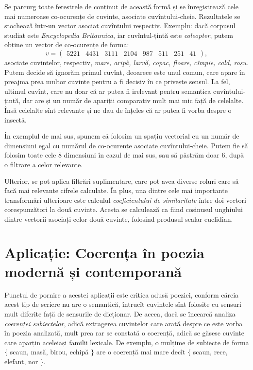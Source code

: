 \documentclass[a4paper]{article}
\begin{document}
Se parcurg toate ferestrele de conținut de această formă și se înregistrează
cele mai numeroase co-ocurențe de cuvinte, asociate cuvîntului-cheie.
Rezultatele se stochează într-un vector asociat cuvîntului respectiv. Exemplu:
dacă corpusul studiat este \emph{Encyclopedia Britannica}, iar cuvîntul-țintă
este \emph{coleopter}, putem obține un vector de co-ocurențe de forma:
\[
  v = \begin{pmatrix}
    5221 & 4431 & 3111 & 2104 & 987 & 511 & 251 & 41
  \end{pmatrix},
\]
asociate cuvintelor, respectiv, \emph{mare, aripă, larvă, copac, floare, %
  cîmpie, cald, roșu}. Putem decide să ignorăm primul cuvînt, deoarece este
unul comun, care apare în preajma prea multor cuvinte pentru a fi decisiv
în ce privește sensul. La fel, ultimul cuvînt, care nu doar că ar putea fi
irelevant pentru semantica cuvîntului-țintă, dar are și un număr de apariții
comparativ mult mai mic față de celelalte. Însă celelalte sînt relevante
și ne dau de înțeles că ar putea fi vorba despre o insectă.

În exemplul de mai sus, spunem că folosim un spațiu vectorial cu un număr de
dimensiuni egal cu numărul de co-ocurențe asociate cuvîntului-cheie. Putem fie
să folosim toate cele 8 dimensiuni în cazul de mai sus, sau să păstrăm doar 6,
după o filtrare a celor relevante.

Ulterior, se pot aplica filtrări suplimentare, care pot avea diverse roluri care
să facă mai relevante cifrele calculate. În plus, una dintre cele mai importante
transformări ulterioare este calculul \emph{coeficientului de similaritate} între
doi vectori corespunzători la două cuvinte. Acesta se calculează ca fiind
cosinusul unghiului dintre vectorii asociați celor două cuvinte, folosind
produsul scalar euclidian.


\section*{Aplicație: Coerența în poezia modernă și contemporană}

Punctul de pornire a acestei aplicații este critica adusă poeziei, conform
căreia acest tip de scriere nu are o semantică, întrucît cuvintele sînt folosite
cu sensuri mult diferite față de sensurile de dicționar. De aceea, dacă se
încearcă analiza \emph{coerenței subiectelor}, adică extragerea cuvintelor
care arată despre ce este vorba în poezia analizată, mult prea rar se constată
o coerență, adică se găsesc cuvinte care aparțin aceleiași familii lexicale.
De exemplu, o mulțime de subiecte de forma $ \{ $ scaun, masă, birou,
echipă $ \} $ are o coerență mai mare decît $ \{ $ scaun,
rece, elefant, nor $ \} $.
\end{document}
